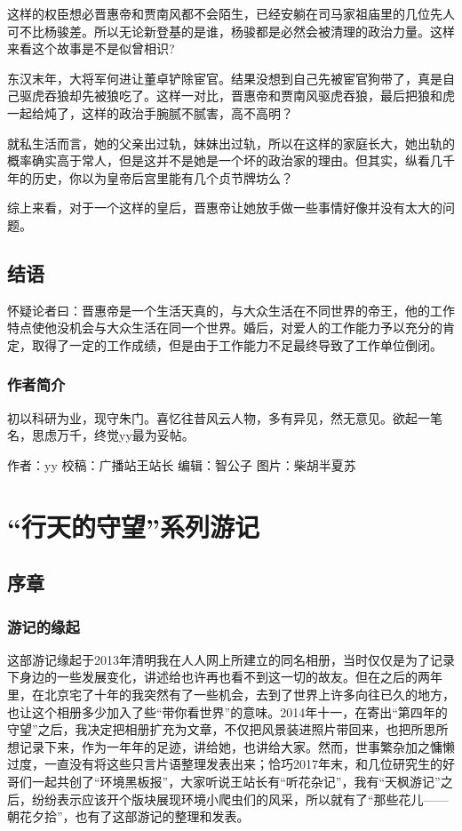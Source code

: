 \documentclass[]{book}
\begin{document}
这样的权臣想必晋惠帝和贾南风都不会陌生，已经安躺在司马家祖庙里的几位先人可不比杨骏差。所以无论新登基的是谁，杨骏都是必然会被清理的政治力量。这样来看这个故事是不是似曾相识?

东汉末年，大将军何进让董卓铲除宦官。结果没想到自己先被宦官狗带了，真是自己驱虎吞狼却先被狼吃了。这样一对比，晋惠帝和贾南风驱虎吞狼，最后把狼和虎一起给炖了，这样的政治手腕腻不腻害，高不高明？

就私生活而言，她的父亲出过轨，妹妹出过轨，所以在这样的家庭长大，她出轨的概率确实高于常人，但是这并不是她是一个坏的政治家的理由。但其实，纵看几千年的历史，你以为皇帝后宫里能有几个贞节牌坊么？

综上来看，对于一个这样的皇后，晋惠帝让她放手做一些事情好像并没有太大的问题。

\subsection{结语}\label{-6}

怀疑论者曰：晋惠帝是一个生活天真的，与大众生活在不同世界的帝王，他的工作特点使他没机会与大众生活在同一个世界。婚后，对爱人的工作能力予以充分的肯定，取得了一定的工作成绩，但是由于工作能力不足最终导致了工作单位倒闭。

\subsubsection*{作者简介}

初以科研为业，现守朱门。喜忆往昔风云人物，多有异见，然无意见。欲起一笔名，思虑万千，终觉yy最为妥帖。

作者：yy 校稿：广播站王站长 编辑：智公子 图片：柴胡半夏苏

\section{\texorpdfstring{``行天的守望''系列游记}{行天的守望系列游记}}

\subsection{序章}

\subsubsection{游记的缘起}

这部游记缘起于2013年清明我在人人网上所建立的同名相册，当时仅仅是为了记录下身边的一些发展变化，讲述给也许再也看不到这一切的故友。但在之后的两年里，在北京宅了十年的我突然有了一些机会，去到了世界上许多向往已久的地方，也让这个相册多少加入了些``带你看世界''的意味。2014年十一，在寄出``第四年的守望''之后，我决定把相册扩充为文章，不仅把风景装进照片带回来，也把所思所想记录下来，作为一年年的足迹，讲给她，也讲给大家。然而，世事繁杂加之慵懒过度，一直没有将这些只言片语整理发表出来；恰巧2017年末，和几位研究生的好哥们一起共创了``环境黑板报''，大家听说王站长有``听花杂记''，我有``天枫游记''之后，纷纷表示应该开个版块展现环境小爬虫们的风采，所以就有了``那些花儿------朝花夕拾''，也有了这部游记的整理和发表。
\end{document}

